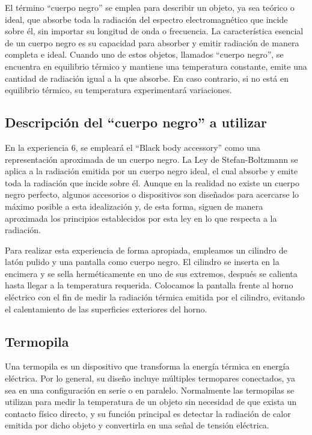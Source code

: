 \documentclass[letterpaper, 12pt]{article}
\begin{document}
El término ``cuerpo negro'' se emplea para describir un
objeto, ya sea teórico o ideal, que absorbe toda la
radiación del espectro electromagnético que incide sobre
él, sin importar su longitud de onda o frecuencia. La
característica esencial de un cuerpo negro es su capacidad
para absorber y emitir radiación de manera completa e
ideal. Cuando uno de estos objetos, llamados ``cuerpo
negro'', se encuentra en equilibrio térmico y mantiene una
temperatura constante, emite una cantidad de radiación
igual a la que absorbe. En caso contrario, si no está en
equilibrio térmico, su temperatura experimentará
variaciones.

\subsection{Descripción del ``cuerpo negro'' a utilizar}

En la experiencia 6, se empleará el ``Black body
accessory'' como una representación aproximada de un cuerpo
negro. La Ley de Stefan-Boltzmann se aplica a la radiación
emitida por un cuerpo negro ideal, el cual absorbe y emite
toda la radiación que incide sobre él. Aunque en la
realidad no existe un cuerpo negro perfecto, algunos
accesorios o dispositivos son diseñados para acercarse lo
máximo posible a esta idealización y, de esta forma, siguen
de manera aproximada los principios establecidos por esta
ley en lo que respecta a la radiación.

Para realizar esta experiencia de forma apropiada,
empleamos un cilindro de latón pulido y una pantalla como
cuerpo negro. El cilindro se inserta en la encimera y se
sella herméticamente en uno de sus extremos, después se
calienta hasta llegar a la temperatura requerida. Colocamos
la pantalla frente al horno eléctrico con el fin de medir
la radiación térmica emitida por el cilindro, evitando el
calentamiento de las superficies exteriores del horno.

\subsection{Termopila~\cite{Termopilas}}

Una termopila es un dispositivo que transforma la energía
térmica en energía eléctrica. Por lo general, su diseño
incluye múltiples termopares conectados, ya sea en una
configuración en serie o en paralelo. Normalmente las
termopilas se utilizan para medir la temperatura de un
objeto sin necesidad de que exista un contacto físico
directo, y su función principal es detectar la radiación de
calor emitida por dicho objeto y convertirla en una señal
de tensión eléctrica.
\end{document}
